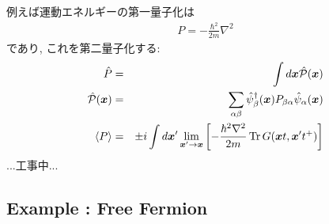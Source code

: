 \documentclass[10.5pt,a4paper]{jreport}
\begin{document}
例えば運動エネルギーの第一量子化は
\begin{eqnarray}
  P = -\frac{\hbar^2}{2m}\nabla^2
\end{eqnarray}
であり, これを第二量子化する:
\begin{eqnarray}
  \hat{P} &=& \int d\bm{x} \hat{{\cal P}}(\bm{x})\\
  \hat{{\cal P}}(\bm{x}) &=& \sum_{\alpha\beta}\hat{\psi}^\dagger_\beta(\bm{x})P_{\beta\alpha}\hat{\psi}_\alpha(\bm{x})\\
  \ev{P} &=& \pm i\int d\bm{x}'\lim_{\bm{x}' \rightarrow \bm{x}}\qty[-\frac{\hbar^2\nabla^2}{2m}\Tr G(\bm{x}t, \bm{x}'t^+)]
\end{eqnarray}
...工事中...
\subsection{Example : Free Fermion}
\end{document}
